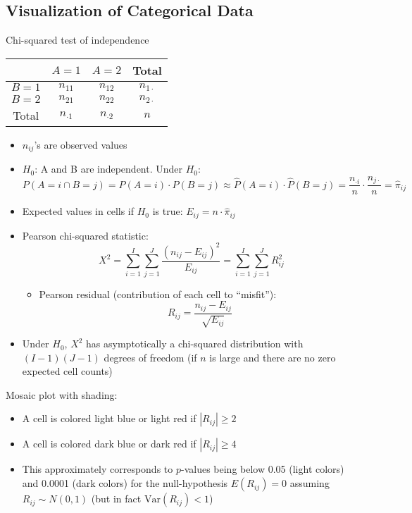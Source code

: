 \documentclass[a4paper]{article}
\begin{document}
\subsection{Visualization of Categorical Data}

Chi-squared test of independence
\begin{table}[!htbp]
    \centering
    \begin{tabular}{cccc}
    \hline
           & $A=1$    & $A=2$    & Total        \\
           \hline
    $B=1$  & $n_{11}$ & $n_{12}$ & $n_{1\cdot}$ \\
    $B=2$  & $n_{21}$ & $n_{22}$ & $n_{2\cdot}$ \\
    \hline 
    Total  & $n_{\cdot 1}$ & $n_{\cdot 2}$ & $n$ \\
    \hline
    \end{tabular}
\end{table}
\begin{itemize}
    \item $n_{ij}$'s are observed values
    \item $H_0$: A and B are independent. Under $H_0$:
    \[P(A=i\cap B=j)=P(A=i)\cdot P(B=j)\approx\hat{P}(A=i)\cdot\hat{P}(B=j)=\frac{n_{\cdot i}}{n}\cdot\frac{n_{j\cdot}}{n}=\hat{\pi}_{ij} \]
    \item Expected values in cells if $H_0$ is true: $E_{ij}=n\cdot\hat{\pi}_{ij}$
    \item Pearson chi-squared statistic:
    \[X^2=\sum_{i=1}^{I}\sum_{j=1}^{J}\frac{(n_{ij}-E_{ij})^2}{E_{ij}}=\sum_{i=1}^{I}\sum_{j=1}^{J}R_{ij}^2 \]
    \begin{itemize}
        \item Pearson residual (contribution of each cell to ``misfit''):
        \[R_{ij}=\frac{n_{ij}-E_{ij}}{\sqrt{E_{ij}}} \]
    \end{itemize}
    \item Under $H_0$, $X^2$ has asymptotically a chi-squared distribution with $(I-1)(J-1)$ degrees of freedom (if $n$ is large and there are no zero expected cell counts)
\end{itemize} 

Mosaic plot with shading:
\begin{itemize}
    \item A cell is colored light blue or light red if $|R_{ij}|\geq 2$
    \item A cell is colored dark blue or dark red if $|R_{ij}|\geq 4$
    \item This approximately corresponds to $p$-values being below 0.05 (light colors) and 0.0001 (dark colors) for the null-hypothesis $E(R_{ij})=0$ assuming $R_{ij}\sim N(0,1)$ (but in fact $\text{Var}(R_{ij})<1$)
\end{itemize}
\end{document}

